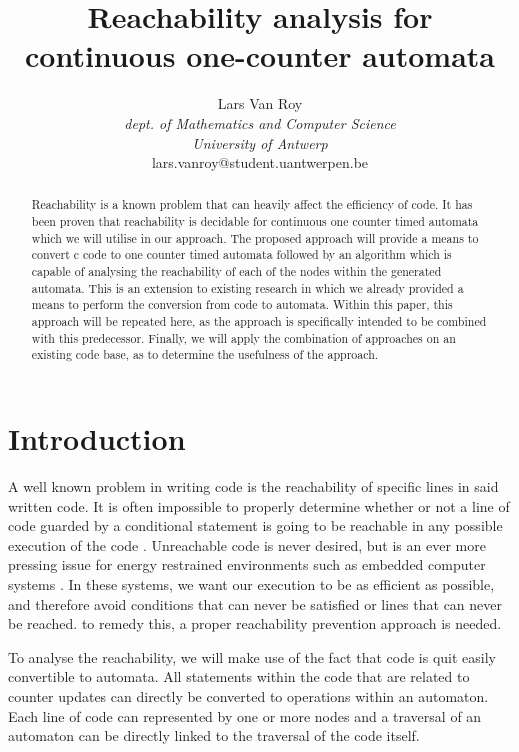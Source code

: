 \documentclass[12pt]{article}
\title{Reachability analysis for continuous one-counter automata}
\author{Lars Van Roy\\
\textit{dept. of Mathematics and Computer Science} \\
\textit{University of Antwerp}\\
lars.vanroy@student.uantwerpen.be}
\begin{document}
\maketitle{}

\begin{abstract}
\noindent
Reachability is a known problem that can heavily affect the efficiency of code. It has been proven that reachability is decidable for continuous one counter timed automata which we will utilise in our approach. The proposed approach will provide a means to convert c code to one counter timed automata followed by an algorithm which is capable of analysing the reachability of each of the nodes within the generated automata. This is an extension to existing research in which we already provided a means to perform the conversion from code to automata. Within this paper, this approach will be repeated here, as the approach is specifically intended to be combined with this predecessor. Finally, we will apply the combination of approaches on an existing code base, as to determine the usefulness of the approach.

\end{abstract}

\newpage
\tableofcontents

\newpage

\section{Introduction}
A well known problem in writing code is the reachability of specific lines in said written code. It is often impossible to properly determine whether or not a line of code guarded by a conditional statement is going to be reachable in any possible execution of the code \cite{713323, 10.1145/1292316.1292319}. Unreachable code is never desired, but is an ever more pressing issue for energy restrained environments such as embedded computer systems \cite{embeddedefficiency}. In these systems, we want our execution to be as efficient as possible, and therefore avoid conditions that can never be satisfied or lines that can never be reached. to remedy this, a proper reachability prevention approach is needed.

To analyse the reachability, we will make use of the fact that code is quit easily convertible to automata. All statements within the code that are related to counter updates can directly be converted to operations within an automaton. Each line of code can represented by one or more nodes and a traversal of an automaton can be directly linked to the traversal of the code itself.
\end{document}
